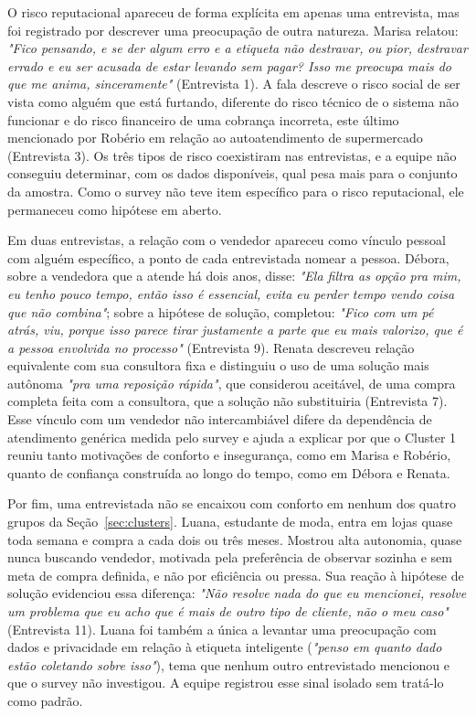 O risco reputacional apareceu de forma explícita em apenas uma entrevista, mas foi registrado por descrever uma preocupação de outra natureza. Marisa relatou: \emph{"Fico pensando, e se der algum erro e a etiqueta não destravar, ou pior, destravar errado e eu ser acusada de estar levando sem pagar? Isso me preocupa mais do que me anima, sinceramente"} (Entrevista 1). A fala descreve o risco social de ser vista como alguém que está furtando, diferente do risco técnico de o sistema não funcionar e do risco financeiro de uma cobrança incorreta, este último mencionado por Robério em relação ao autoatendimento de supermercado (Entrevista 3). Os três tipos de risco coexistiram nas entrevistas, e a equipe não conseguiu determinar, com os dados disponíveis, qual pesa mais para o conjunto da amostra. Como o survey não teve item específico para o risco reputacional, ele permaneceu como hipótese em aberto.

Em duas entrevistas, a relação com o vendedor apareceu como vínculo pessoal com alguém específico, a ponto de cada entrevistada nomear a pessoa. Débora, sobre a vendedora que a atende há dois anos, disse: \emph{"Ela filtra as opção pra mim, eu tenho pouco tempo, então isso é essencial, evita eu perder tempo vendo coisa que não combina"}; sobre a hipótese de solução, completou: \emph{"Fico com um pé atrás, viu, porque isso parece tirar justamente a parte que eu mais valorizo, que é a pessoa envolvida no processo"} (Entrevista 9). Renata descreveu relação equivalente com sua consultora fixa e distinguiu o uso de uma solução mais autônoma \emph{"pra uma reposição rápida"}, que considerou aceitável, de uma compra completa feita com a consultora, que a solução não substituiria (Entrevista 7). Esse vínculo com um vendedor não intercambiável difere da dependência de atendimento genérica medida pelo survey e ajuda a explicar por que o Cluster 1 reuniu tanto motivações de conforto e insegurança, como em Marisa e Robério, quanto de confiança construída ao longo do tempo, como em Débora e Renata.

Por fim, uma entrevistada não se encaixou com conforto em nenhum dos quatro grupos da Seção~\ref{sec:clusters}. Luana, estudante de moda, entra em lojas quase toda semana e compra a cada dois ou três meses. Mostrou alta autonomia, quase nunca buscando vendedor, motivada pela preferência de observar sozinha e sem meta de compra definida, e não por eficiência ou pressa. Sua reação à hipótese de solução evidenciou essa diferença: \emph{"Não resolve nada do que eu mencionei, resolve um problema que eu acho que é mais de outro tipo de cliente, não o meu caso"} (Entrevista 11). Luana foi também a única a levantar uma preocupação com dados e privacidade em relação à etiqueta inteligente (\emph{"penso em quanto dado estão coletando sobre isso"}), tema que nenhum outro entrevistado mencionou e que o survey não investigou. A equipe registrou esse sinal isolado sem tratá-lo como padrão.

